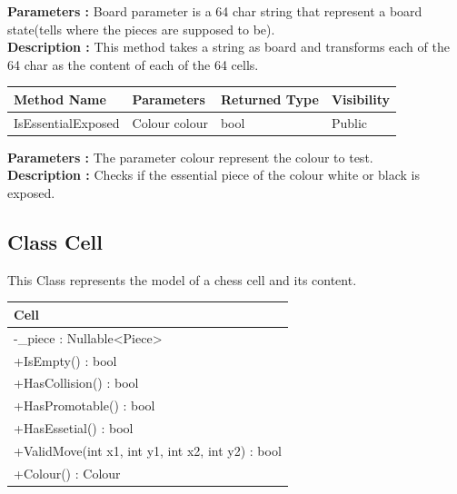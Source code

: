 \documentclass[12pt]{article}
\begin{document}
\textbf{Parameters :} Board parameter is a 64 char string that represent
a board state(tells where the pieces are supposed to be).
\\

\textbf{Description :} This method takes a string as board and transforms
each of the 64 char as the content of each of the 64 cells.

\begin{table}[H]
    \begin{tabular}{|l|l|l|l|}
    \hline
    \rowcolor[HTML]{EFEFEF} 
    \cellcolor[HTML]{EFEFEF}\textbf{Method Name} & \textbf{Parameters}     & \textbf{Returned Type} & \textbf{Visibility} \\ \hline
    IsEssentialExposed                           & Colour colour           & bool                   & Public              \\ \hline
    \end{tabular}
\end{table}

\textbf{Parameters :} The parameter colour represent the colour
to test.
\\

\textbf{Description :} Checks if the essential piece of the colour white or black
is exposed.

\newpage


\subsection{Class Cell}

This Class represents the model of a chess cell and its content.

\begin{table}[H]
    \begin{tabular}{|l|}
    \hline
    \rowcolor[HTML]{C0C0C0} 
    \textbf{Cell}                                    \\ \hline
    \rowcolor[HTML]{EFEFEF}
    -\_piece : Nullable<Piece>                        \\ \hline
    +IsEmpty() : bool                                 \\ \hline
    +HasCollision() : bool                            \\ \hline
    +HasPromotable() : bool                           \\ \hline
    +HasEssetial() : bool                             \\ \hline
    +ValidMove(int x1, int y1, int x2, int y2) : bool \\ \hline
    +Colour() : Colour                                \\ \hline
    \end{tabular}
\end{table}
\end{document}
